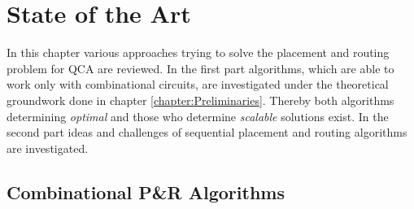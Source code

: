 \chapter{State of the Art}\label{chapter:SotA}
In this chapter various approaches trying to solve the placement and routing problem for QCA are reviewed. In the first part algorithms, which are able to work only with combinational circuits, are investigated under the theoretical groundwork done in chapter \ref{chapter:Preliminaries}. Thereby both algorithms determining \textit{optimal} and those who determine \textit{scalable} solutions exist. In the second part ideas and challenges of sequential placement and routing algorithms are investigated.

\section{Combinational P\&R Algorithms}

